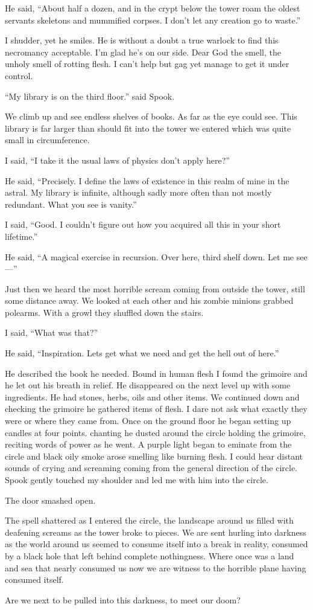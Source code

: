 He said, ``About half a dozen, and in the crypt below the tower roam the oldest servants skeletons and mummified corpses. I don't let any creation go to waste.''

I shudder, yet he smiles. He is without a doubt a true warlock to find this necromancy acceptable. I'm glad he's on our side. Dear God the smell, the unholy smell of rotting flesh. I can't help but gag yet manage to get it under control.

``My library is on the third floor.'' said Spook.

We climb up and see endless shelves of books. As far as the eye could see. This library is far larger than should fit into the tower we entered which was quite small in circumference.

I said, ``I take it the usual laws of physics don't apply here?''

He said, ``Precisely. I define the laws of existence in this realm of mine in the astral. My library is infinite, although sadly more often than not mostly redundant. What you see is vanity.''

I said, ``Good. I couldn't figure out how you acquired all this in your short lifetime.''

He said, ``A magical exercise in recursion. Over here, third shelf down. Let me see---''

Just then we heard the most horrible scream coming from outside the tower, still some distance away. We looked at each other and his zombie minions grabbed polearms. With a growl they shuffled down the stairs.

I said, ``What was that?''

He said, ``Inspiration. Lets get what we need and get the hell out of here.''

He described the book he needed. Bound in human flesh I found the grimoire and he let out his breath in relief. He disappeared on the next level up with some ingredients. He had stones, herbs, oils and other items. We continued down and checking the grimoire he gathered items of flesh. I dare not ask what exactly they were or where they came from. Once on the ground floor he began setting up candles at four points. chanting he dusted around the circle holding the grimoire, reciting words of power as he went. A purple light began to eminate from the circle and black oily smoke arose smelling like burning flesh. I could hear distant sounds of crying and screaming coming from the general direction of the circle. Spook gently touched my shoulder and led me with him into the circle.

The door smashed open.

The spell shattered as I entered the circle, the landscape around us filled with deafening screams as the tower broke to pieces. We are sent hurling into darkness as the world around us seemed to consume itself into a break in reality, consumed by a black hole that left behind complete nothingness. Where once was a land and sea that nearly consumed us now we are witness to the horrible plane having consumed itself.

Are we next to be pulled into this darkness, to meet our doom?

